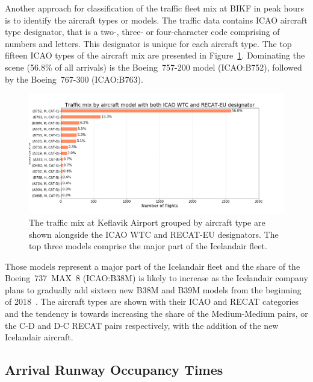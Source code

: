 Another approach for classification of the traffic fleet mix at BIKF in peak hours is to identify the aircraft types or models. The traffic data contains ICAO aircraft type designator, that is a two-, three- or four-character code comprising of numbers and letters. This designator is unique for each aircraft type. The top fifteen ICAO types of the aircraft mix are presented in Figure~\ref{fig:traffic_mix_by_model}. Dominating the scene (56.8\% of all arrivals) is the Boeing~757-200 model (ICAO:B752), followed by the Boeing~767-300 (ICAO:B763).
\begin{figure}[h]
    \centering
    \includegraphics[width=1\textwidth]{graphics/fig_traffic_mix_by_model.png}
    \caption[Traffic mix by aircraft model.]{The traffic mix at Keflavik Airport grouped by aircraft type are shown alongside the ICAO WTC and RECAT-EU designators. The top three models comprise the major part of the Icelandair fleet.}
    \label{fig:traffic_mix_by_model}
\end{figure}
 Those models represent a major part of the Icelandair fleet and the share of the Boeing~737~MAX~8 (ICAO:B38M) is likely to increase as the Icelandair company plans to gradually add sixteen new B38M and B39M models from the beginning of 2018~\cite{icelandair_fleet}. The aircraft types are shown with their ICAO and RECAT categories and the tendency is towards increasing the share of the Medium-Medium pairs, or the C-D and D-C RECAT pairs respectively, with the addition of the new Icelandair aircraft.






\subsection{Arrival Runway Occupancy Times} 

